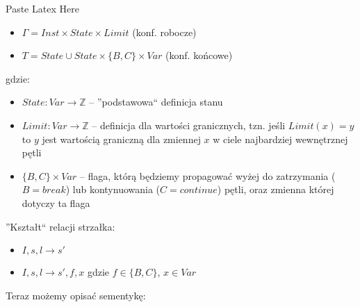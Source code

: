 Paste Latex Here\documentclass{article}
\begin{document}
\begin{itemize}
	\item $\Gamma = Inst \times State \times Limit$ (konf. robocze)
	\item $T = State \cup State \times \{B,C\} \times Var$ (konf. końcowe)
\end{itemize}
gdzie:
\begin{itemize}
	\item
	      $State: Var \rightarrow \mathbb{Z}$ -- ''podstawowa`` definicja stanu

	\item
	      $Limit: Var \rightarrow \mathbb{Z}$ -- definicja dla wartości granicznych, tzn. jeśli $Limit(x)=y$ to $y$ jest wartością graniczną dla zmiennej $x$ w ciele najbardziej wewnętrznej pętli

	\item
	      $\{B,C\} \times Var$ -- flaga, którą będziemy propagować wyżej do zatrzymania ($B = break$) lub kontynuowania ($C = continue$) pętli, oraz zmienna której dotyczy ta flaga

\end{itemize}
''Kształt`` relacji strzałka:
\begin{itemize}
	\item $I,s,l \rightarrow s'$
	\item $I,s,l \rightarrow s',f,x$ gdzie $f \in \{B,C\}$, $x \in Var$
\end{itemize}
Teraz możemy opisać sementykę:
\end{document}
